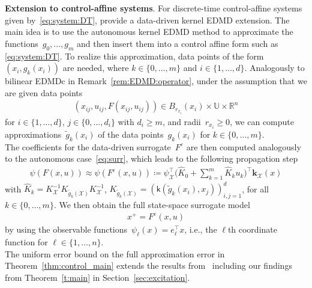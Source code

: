 \documentclass[a4paper, reqno]{amsart}
\renewcommand{\k}{\mathsf{k}}
\begin{document}
\textbf{Extension to control-affine systems}.
For discrete-time control-affine systems given by~\cref{eq:system:DT}, \cite[Section 4]{BoldPhil24} provide a data-driven kernel EDMD extension. 
The main idea is to use the autonomous kernel EDMD method to approximate the functions~$g_0, \dots, g_m$ and then insert them into a control affine form such as \eqref{eq:system:DT}. 
To realize this approximation, data points of the form~$(x_i, g_k(x_i))$ are needed, where $k \in \{0, \dots, m\}$ and $i \in \{1, \dots, d\}$. Analogously to bilinear EDMDc in Remark~\ref{rem:EDMD:operator}, under the assumption that we are given data points \begin{align}\label{eq:data:kEDMD}
(x_{ij},u_{ij},F(x_{ij},u_{ij})) \in  B_{r_{x_i}}(x_i) \times \mathbb{U} \times \mathbb{R}^n
\end{align} 
for $i\in \{1, \dots, d\}$, $j \in \{0, \dots, d_i\}$ with $d_i \geq m$, and radii~$r_{x_i} \geq 0$, we can compute approximations~$\tilde{g}_k(x_i)$ of the data points~$g_k(x_i)$ for $k \in \{ 0, \dots, m\}$. \\ 
The coefficients for the data-driven surrogate~$F^\varepsilon$ are then computed analogously to the autonomous case~\eqref{eq:surr}, which leads to the following propagation step
\begin{align*}
    \psi(F(x, u)) \approx \psi(F^\varepsilon(x, u)) \coloneqq \psi_\mathcal{X}^\top \Big(\widehat{K}_0 + \sum_{k = 1}^m \widehat{K}_k u_k\Big)^\top \mathbf{k}_\mathcal{X}(x)
\end{align*}
with $\widehat{K}_k = K_\mathcal{X}^{-1}K_{\tilde{g}_k(\mathcal{X})}K_\mathcal{X}^{-1}$, $K_{\tilde{g}_k(\mathcal{X})} = (\k(\tilde{g}_k(x_i), x_j))_{i, j = 1}^{d}$, for all $k \in \{0, \dots, m\}$. 
We then obtain the full state-space surrogate model 
\begin{align*}
    x^+ = F^\varepsilon(x, u)
\end{align*}
by using the observable functions~$\psi_\ell(x) = e_\ell^\top x$, i.e., the $\ell$th coordinate function for $\ell \in \{1, \dots, n\}$.\\
The uniform error bound on the full approximation error in Theorem~\ref{thm:control_main} extends the results from~\cite[Thm.\ 3]{schimperna2025data} including our findings from Theorem~\ref{t:main} in  Section~\ref{sec:excitation}.
\end{document}
